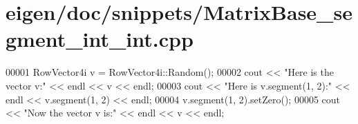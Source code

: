 \hypertarget{eigen_2doc_2snippets_2_matrix_base__segment__int__int_8cpp_source}{}\section{eigen/doc/snippets/\+Matrix\+Base\+\_\+segment\+\_\+int\+\_\+int.cpp}
\label{eigen_2doc_2snippets_2_matrix_base__segment__int__int_8cpp_source}

\begin{DoxyCode}
00001 RowVector4i v = RowVector4i::Random();
00002 cout << \textcolor{stringliteral}{"Here is the vector v:"} << endl << v << endl;
00003 cout << \textcolor{stringliteral}{"Here is v.segment(1, 2):"} << endl << v.segment(1, 2) << endl;
00004 v.segment(1, 2).setZero();
00005 cout << \textcolor{stringliteral}{"Now the vector v is:"} << endl << v << endl;
\end{DoxyCode}
